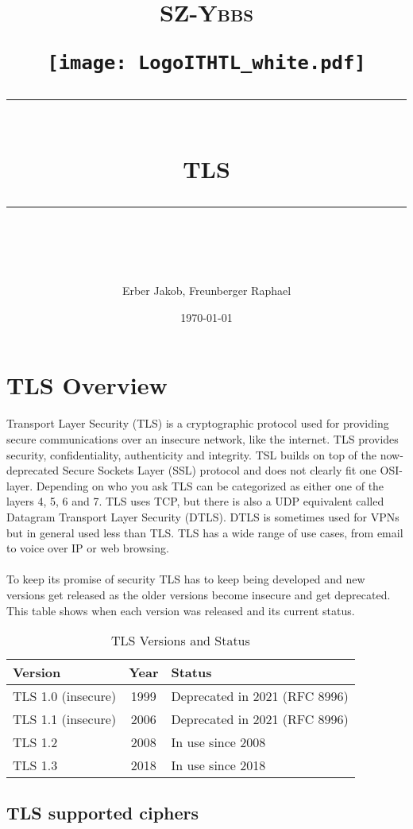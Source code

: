 \documentclass[11pt]{scrartcl} %
\title{	
	\normalfont\normalsize
	\begin{center}
		\begin{minipage}[c]{0.2\textwidth}
			\textsc{\Large SZ-Ybbs}
		\end{minipage}%
		\begin{minipage}[c]{0.1\textwidth}
			\texttt{[image: LogoITHTL\_white.pdf]}
		\end{minipage}
	\end{center}
	\vspace{10pt} %
	\rule{\linewidth}{0.5pt}\\ %
	\vspace{20pt} %
	{\huge TLS}\\ %
	\vspace{12pt} %
	\rule{\linewidth}{2pt}\\ %
	\vspace{12pt} %
}
\author{\LARGE Erber Jakob, Freunberger Raphael} %
\date{\normalsize\today} %
\begin{document}
\maketitle %

\section{TLS Overview}

Transport Layer Security (TLS) is a cryptographic protocol used for providing secure communications over an insecure network, like the internet. TLS provides security, confidentiality, authenticity and integrity. TSL builds on top of the now-deprecated Secure Sockets Layer (SSL) protocol and does not clearly fit one OSI-layer. Depending on who you ask TLS can be categorized as either one of the layers 4, 5, 6 and 7. 
TLS uses TCP, but there is also a UDP equivalent called Datagram Transport Layer Security (DTLS). DTLS is sometimes used for VPNs but in general used less than TLS. TLS has a wide range of use cases, from email to voice over IP or web browsing.
\\\\
To keep its promise of security TLS has to keep being developed and new versions get released as the older versions become insecure and get deprecated. This table shows when each version was released and its current status.

\begin{table}[h]
    \centering
    \begin{tabular}{|l|c|l|}
        \hline
        \textbf{Version} & \textbf{Year} & \textbf{Status} \\ \hline
        TLS 1.0 (insecure) & 1999 & Deprecated in 2021 (RFC 8996) \\ \hline
        TLS 1.1 (insecure) & 2006 & Deprecated in 2021 (RFC 8996) \\ \hline
        TLS 1.2 & 2008 & In use since 2008 \\ \hline
        TLS 1.3 & 2018 & In use since 2018 \\ \hline
    \end{tabular}
    \caption{TLS Versions and Status}
    \label{tab:tls_versions}
\end{table}

\subsection{TLS supported ciphers}
\label{sec:tls_supported_ciphers}
\end{document}
